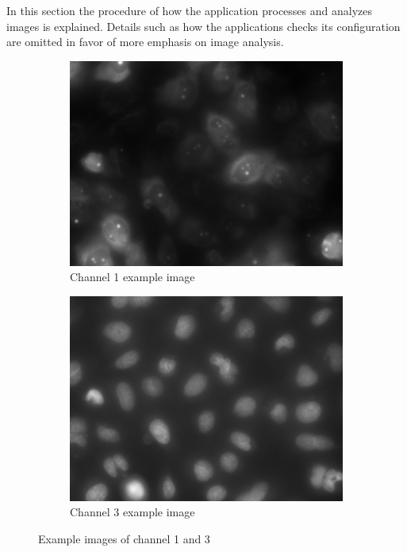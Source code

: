\documentclass[a4paper, 12pt, twoside]{article}
\begin{document}
In this section the procedure of how the application processes and analyzes
images is explained. Details such as how the applications checks its
configuration are omitted in favor of more emphasis on image analysis.

\begin{figure}[h]
\centering
\begin{subfigure}[b]{0.48\textwidth}
\includegraphics[width=\textwidth]{images/example_Kanal1}
\caption{Channel 1 example image}
\end{subfigure}
\begin{subfigure}[b]{0.48\textwidth}
\includegraphics[width=\textwidth]{images/example_Kanal3}
\caption{Channel 3 example image}
\label{fig:channel3}
\end{subfigure}
\caption{Example images of channel 1 and 3}
\label{fig:example_images}
\end{figure}
\end{document}
